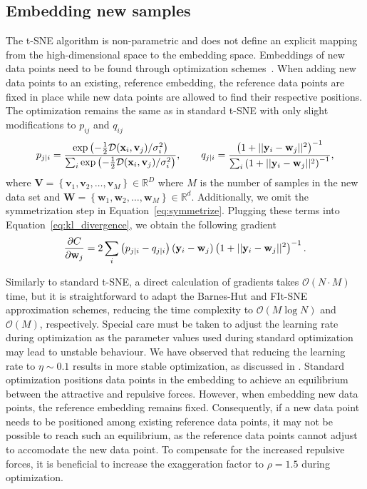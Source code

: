 \documentclass[article]{jss}
\begin{document}
\subsection{Embedding new samples} \label{sec:meth.transform}

The t-SNE algorithm is non-parametric and does not define an explicit mapping from the
high-dimensional space to the embedding space. Embeddings of new data
points need to be found through optimization
schemes~\citep{policar2021embedding}. When adding new data points to an
existing, reference embedding, the reference data points are fixed in place
while new data points are allowed to find their respective positions. The
optimization remains the same as in standard t-SNE with only slight
modifications to $p_{ij}$ and $q_{ij}$
\begin{align}
p_{j \mid i} = \frac{\exp \left ( -\frac{1}{2} \mathcal{D}(\mathbf{x}_i, \mathbf{v}_j) /  \sigma_i^2 \right )}{\sum_{i} \exp \left ( -\frac{1}{2} \mathcal{D}(\mathbf{x}_i, \mathbf{v}_j) / \sigma_i^2 \right )}, \qquad
q_{j \mid i} = \frac{\left ( 1 + || \mathbf{y}_i - \mathbf{w}_j ||^2 \right )^{-1}}{\sum_{i}\left ( 1 + || \mathbf{y}_i - \mathbf{w}_j ||^2 \right )^{-1}}, \notag
\end{align}
\noindent where $\mathbf{V} = \left \{ \mathbf{v}_1, \mathbf{v}_2, \dots,
\mathbf{v}_M \right \} \in \mathbb{R}^D$ where $M$ is the number of samples in
the new data set and $\mathbf{W} = \left \{ \mathbf{w}_1, \mathbf{w}_2, \dots,
\mathbf{w}_M \right \} \in \mathbb{R}^d$. Additionally, we omit the
symmetrization step in Equation~\ref{eq:symmetrize}. Plugging these terms into
Equation~\ref{eq:kl_divergence}, we obtain the following gradient
\begin{equation}
\frac{\partial C}{\partial \mathbf{w}_j} = 2 \sum_i \left ( p_{j \mid i} - q_{j \mid i} \right ) \left ( \mathbf{y}_i - \mathbf{w}_j \right ) \left ( 1 + || \mathbf{y}_i - \mathbf{w}_j || ^2 \right )^{-1}. \notag
\label{eq:gradient}
\end{equation}

Similarly to standard t-SNE, a direct calculation of gradients takes $\mathcal{O}(N \cdot M)$ time, but it is straightforward to adapt the Barnes-Hut and FIt-SNE approximation schemes, reducing the time complexity to $\mathcal{O}(M \log N)$ and $\mathcal{O}(M)$, respectively. Special care must be taken to adjust the learning rate during optimization as the parameter values used during standard optimization may lead to  unstable behaviour. We have observed that reducing the learning rate to $\eta \sim 0.1$ results in more stable optimization, as discussed in \citet{policar2021embedding}. Standard optimization positions data points in the embedding to achieve an equilibrium between the attractive and repulsive forces. However, when embedding new data points, the reference embedding remains fixed. Consequently, if a new data point needs to be positioned among existing reference data points, it may not be possible to reach such an equilibrium, as the reference data points cannot adjust to accomodate the new data point. To compensate for the increased repulsive forces, it is beneficial to increase the exaggeration factor to $\rho=1.5$ during optimization.
\end{document}
